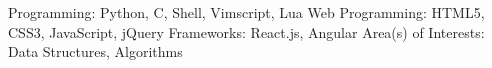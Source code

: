 \begin{cvhonors}
  \cvhonor
    {Programming:}
    {Python, C, Shell, Vimscript, Lua}
    {}
    {}
  \cvhonor
    {Web Programming:}
    {HTML5, CSS3, JavaScript, jQuery}
    {}
    {}
  \cvhonor
    {Frameworks:}
    {React.js, Angular}
    {}
    {}
  \cvhonor
    {Area(s) of Interests:}
    {Data Structures, Algorithms}
    {}
    {}
\end{cvhonors}


